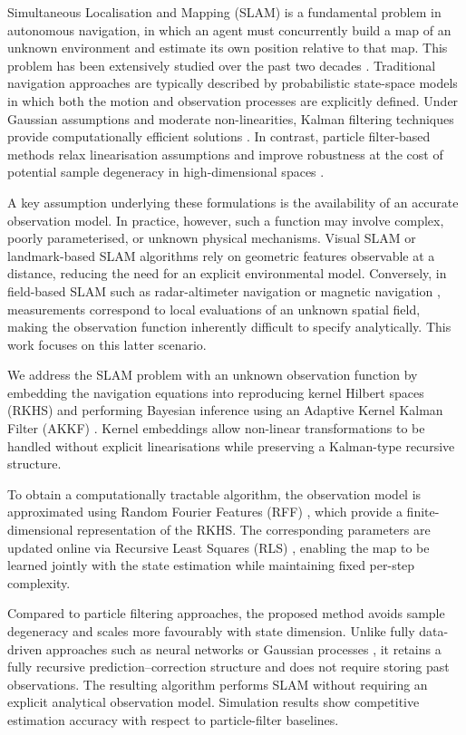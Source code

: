 \documentclass[conference]{IEEEtran}
\begin{document}
Simultaneous Localisation and Mapping (SLAM) is a fundamental problem in autonomous navigation, in which an agent must concurrently build a map of an unknown environment and estimate its own position relative to that map. This problem has been extensively studied over the past two decades \cite{bib:tuto_SLAM,bib:Proba_robots}. Traditional navigation approaches are typically described by probabilistic state-space models in which both the motion and observation processes are explicitly defined. Under Gaussian assumptions and moderate non-linearities, Kalman filtering techniques provide computationally efficient solutions \cite{bib:UKF}. In contrast, particle filter-based methods relax linearisation assumptions and improve robustness at the cost of potential sample degeneracy in high-dimensional spaces \cite{bib:tuto_PF}.

A key assumption underlying these formulations is the availability of an accurate observation model. In practice, however, such a function may involve complex, poorly parameterised, or unknown physical mechanisms. Visual SLAM \cite{bib:visual_SLAM} or landmark-based SLAM \cite{bib:FastSLAM} algorithms rely on geometric features observable at a distance, reducing the need for an explicit environmental model. Conversely, in field-based SLAM such as radar-altimeter navigation \cite{bib:SLAM_Camille} or magnetic navigation \cite{bib:SLAM_magneto,bib:SLAM_Manon}, measurements correspond to local evaluations of an unknown spatial field, making the observation function inherently difficult to specify analytically. This work focuses on this latter scenario.

We address the SLAM problem with an unknown observation function by embedding the navigation equations into reproducing kernel Hilbert spaces (RKHS) \cite{bib:RKHS} and performing Bayesian inference using an Adaptive Kernel Kalman Filter (AKKF) \cite{bib:AKKF}. Kernel embeddings allow non-linear transformations to be handled without explicit linearisations while preserving a Kalman-type recursive structure.

To obtain a computationally tractable algorithm, the observation model is approximated using Random Fourier Features (RFF) \cite{bib:RFF}, which provide a finite-dimensional representation of the RKHS. The corresponding parameters are updated online via Recursive Least Squares (RLS) \cite{bib:RFF_RLS}, enabling the map to be learned jointly with the state estimation while maintaining fixed per-step complexity.

Compared to particle filtering approaches, the proposed method avoids sample degeneracy and scales more favourably with state dimension. Unlike fully data-driven approaches such as neural networks \cite{bib:SLAM_NN} or Gaussian processes \cite{bib:SLAM_GP}, it retains a fully recursive prediction–correction structure and does not require storing past observations. The resulting algorithm performs SLAM without requiring an explicit analytical observation model. Simulation results show competitive estimation accuracy with respect to particle-filter baselines.
\end{document}
